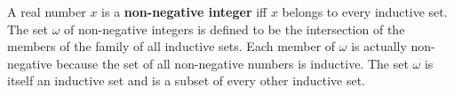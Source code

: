 A real number $x$ is a \textbf{non-negative integer} iff $x$ belongs to every inductive set. The set $\omega$ of non-negative integers is defined to be the intersection of the members of the family of all inductive sets. Each member of $\omega$ is actually non-negative because the set of all non-negative numbers is inductive. The set $\omega$ is itself an inductive set and is a subset of every other inductive set.
